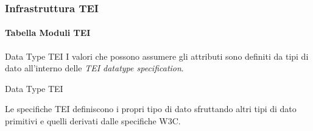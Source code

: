 \begin{frame}
    \frametitle{Infrastruttura TEI}
    \framesubtitle{Tabella Moduli TEI}
    \addtocounter{nframe}{1}
    
    \begin{block}{Data Type TEI}
        I valori che possono assumere gli attributi sono definiti da tipi di dato all'interno delle \textit{TEI datatype specification}.
    \end{block}

    \begin{block}{Data Type TEI}
       
    \end{block}
    Le specifiche TEI definiscono i propri tipo di dato sfruttando altri tipi di dato primitivi e quelli derivati dalle specifiche W3C. 
\end{frame}















